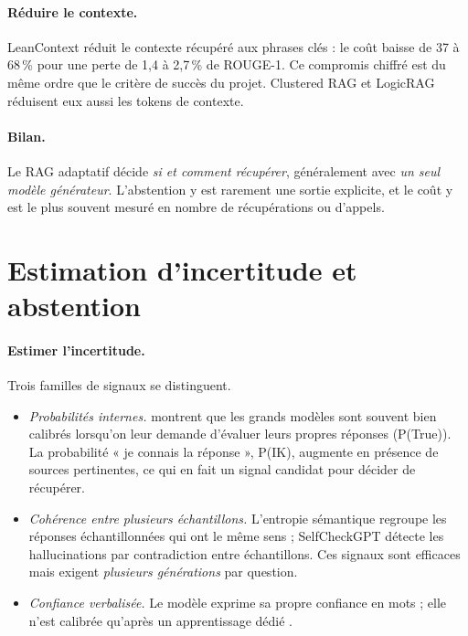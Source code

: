 \documentclass[11pt,a4paper]{article}
\begin{document}
\paragraph{Réduire le contexte.} LeanContext \citep{arefeen2024leancontext} réduit le contexte récupéré
aux phrases clés : le coût baisse de 37 à 68\,\% pour une perte de 1,4 à 2,7\,\% de ROUGE-1. Ce
compromis chiffré est du même ordre que le critère de succès du projet. Clustered RAG
\citep{akesson2024clustered} et LogicRAG \citep{chen2026logicrag} réduisent eux aussi les tokens de
contexte.

\paragraph{Bilan.} Le RAG adaptatif décide \emph{si et comment récupérer}, généralement avec \emph{un
seul modèle générateur}. L'abstention y est rarement une sortie explicite, et le coût y est le plus
souvent mesuré en nombre de récupérations ou d'appels.

\section{Estimation d'incertitude et abstention}\label{sec:incertitude}

\paragraph{Estimer l'incertitude.} Trois familles de signaux se distinguent.
\begin{itemize}
\item \emph{Probabilités internes.} \citet{kadavath2022know} montrent que les grands modèles sont
souvent bien calibrés lorsqu'on leur demande d'évaluer leurs propres réponses (P(True)). La probabilité
« je connais la réponse », P(IK), augmente en présence de sources pertinentes, ce qui en fait un signal
candidat pour décider de récupérer.
\item \emph{Cohérence entre plusieurs échantillons.} L'entropie sémantique \citep{kuhn2023semantic}
regroupe les réponses échantillonnées qui ont le même sens ; SelfCheckGPT \citep{manakul2023selfcheckgpt}
détecte les hallucinations par contradiction entre échantillons. Ces signaux sont efficaces mais
exigent \emph{plusieurs générations} par question.
\item \emph{Confiance verbalisée.} Le modèle exprime sa propre confiance en mots ; elle n'est calibrée
qu'après un apprentissage dédié \citep{lin2022verbal}.
\end{itemize}
\end{document}
